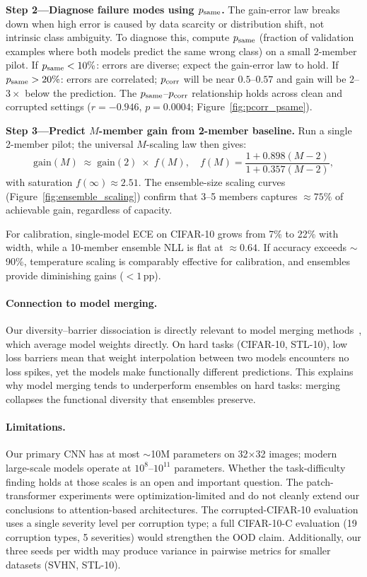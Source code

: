 \documentclass[11pt]{article}
\begin{document}
\textbf{Step 2---Diagnose failure modes using $p_{\rm same}$.}
The gain-error law breaks down when high error is caused by data scarcity
or distribution shift, not intrinsic class ambiguity.  To diagnose this,
compute $p_{\rm same}$ (fraction of validation examples where both models
predict the same wrong class) on a small 2-member pilot.  If
$p_{\rm same} < 10\%$: errors are diverse; expect the gain-error law to hold.
If $p_{\rm same} > 20\%$: errors are correlated; $p_{\rm corr}$ will be
near $0.5$--$0.57$ and gain will be $2$--$3\times$ below the prediction.
The $p_{\rm same}$--$p_{\rm corr}$ relationship holds across clean and corrupted
settings ($r = -0.946$, $p = 0.0004$; Figure~\ref{fig:pcorr_psame}).

\textbf{Step 3---Predict $M$-member gain from 2-member baseline.}
Run a single 2-member pilot; the universal $M$-scaling law then gives:
\[
  \mathrm{gain}(M) \;\approx\; \mathrm{gain}(2) \;\times\; f(M),
  \quad f(M) = \frac{1+0.898(M-2)}{1+0.357(M-2)},
\]
with saturation $f(\infty) \approx 2.51$.
The ensemble-size scaling curves (Figure~\ref{fig:ensemble_scaling}) confirm that
3--5 members captures ${\approx}75\%$ of achievable gain, regardless of capacity.

For calibration, single-model ECE on CIFAR-10 grows from 7\% to 22\%
with width, while a 10-member ensemble NLL is flat at ${\approx}0.64$.
If accuracy exceeds $\sim$90\%, temperature scaling is comparably effective
for calibration, and ensembles provide diminishing gains ($<1$\,pp).

\paragraph{Connection to model merging.}
Our diversity--barrier dissociation is directly relevant to model merging
methods~\citep{wortsman2022model}, which average model weights directly.
On hard tasks (CIFAR-10, STL-10), low loss barriers mean that weight
interpolation between two models encounters no loss spikes, yet the models
make functionally different predictions.  This explains why model merging
tends to underperform ensembles on hard tasks: merging collapses the
functional diversity that ensembles preserve.

\paragraph{Limitations.}
Our primary CNN has at most $\sim$10M parameters on 32$\times$32 images;
modern large-scale models operate at $10^8$--$10^{11}$ parameters.
Whether the task-difficulty finding holds at those scales is an open and
important question.  The patch-transformer experiments were
optimization-limited and do not cleanly extend our conclusions to
attention-based architectures.  The corrupted-CIFAR-10 evaluation uses a
single severity level per corruption type; a full CIFAR-10-C evaluation
(19 corruption types, 5 severities) would strengthen the OOD claim.
Additionally, our three seeds per width may produce variance in
pairwise metrics for smaller datasets (SVHN, STL-10).
\end{document}
